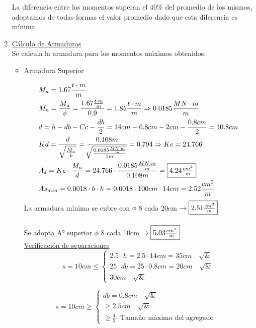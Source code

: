 \begin{enumerate}
La diferencia entre los momentos superan el 40\% del promedio de los mismos, adoptamos de todas formas el valor promedio dado que esta diferencia es mínima.
\newpage
\item \underline{Cálculo de Armaduras}\\
Se calcula la armadura para los momentos máximos obtenidos.
\begin{itemize}
\item Armadura Superior

\begin{align*}
& M_u = 1.67 \frac{t \cdot m}{m} \\
& M_n = \frac{M_u}{\phi} = \frac{1.67 \frac{t \cdot m}{m}}{0.9} = 1.85 \frac{t \cdot m}{m} \Rightarrow 0.0185 \frac{MN \cdot m}{m} \\
& d = h -db - Cc - \frac{db}{2} = 14cm - 0.8cm - 2cm - \frac{0.8cm}{2}= 10.8cm \\
& Kd = \frac{d}{\sqrt{\frac{M_n}{b}}} = \frac{0.108m}{\sqrt[]{\frac{0.0185 \frac{MN \cdot m}{m}}{1m}}} = 0.794 \Rightarrow Ke = 24.766 \\
& A_s = Ke \cdot \frac{M_n}{d} = 24.766 \cdot \frac{0.0185 \frac{MN \cdot m}{m}}{0.108m} = \framebox{$4.24 \frac{cm^2}{m}$}\\
& As_{min} = 0.0018 \cdot b \cdot h = 0.0018 \cdot 100cm \cdot 14cm = 2.52 \frac{cm^2}{m}
\end{align*}
La armadura mínima se cubre con $\phi$ 8 cada 20cm $\rightarrow \framebox{$2.51 \frac{cm^2}{m}$}$ \\
\\
Se adopta A° superior $\phi$ 8 cada 10cm $\rightarrow \framebox{$5.03 \frac{cm^2}{m}$}$ \\

\underline{Verificación de separaciones}\\

\[ s = 10cm \leq \left\{ \begin{array}{ll}
         2.5 \cdot h = 2.5 \cdot 14cm = 35cm \quad \surd & \\
         25 \cdot db = 25 \cdot 0.8cm = 20cm \quad \surd &\\
         30cm \quad \surd & \end{array} \right. \] 
         
\[ s = 10cm \geq \left\{ \begin{array}{ll}
         db = 0.8cm \quad \surd & \\
         \geq 2.5cm \quad \surd &\\
         \geq \frac{4}{3} \cdot \text{Tamaño máximo del agregado} & \end{array} \right. \] 


\end{itemize}
\end{enumerate}
